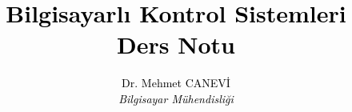\documentclass[12pt,twoside]{book}
\begin{document}
\shorthandoff{=} %
\renewcommand{\chaptername}{Bölüm}
\renewcommand{\contentsname}{İçindekiler}
\renewcommand{\figurename}{Şekil}
\renewcommand{\tablename}{Çizelge}
\renewcommand{\bibname}{Kaynaklar}
\renewcommand{\listfigurename}{Şekiller}
\renewcommand{\listtablename}{Çizelgeler}
\renewcommand{\appendixname}{Ek}
\renewcommand{\indexname}{Dizin}
\renewcommand{\partname}{Bölüm}
\renewcommand{\proofname}{İspat}
\title{\bfseries{\sc\textcolor{black}{Bilgisayarlı Kontrol Sistemleri \\ Ders Notu}}}
\author{\textcolor{black}{Dr. Mehmet CANEVİ} \\[5pt]
\emph{\textcolor{black}{Bilgisayar Mühendisliği}}\\[2cm]
   \vspace{2cm}
}
\date{}

\maketitle
\let \savenumberline \numberline
\def \numberline#1{\savenumberline{#1.}}
\tableofcontents














\end{document}
